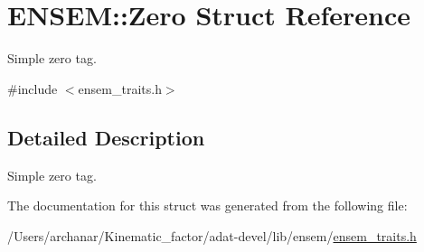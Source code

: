 \hypertarget{structENSEM_1_1Zero}{}\section{E\+N\+S\+EM\+:\+:Zero Struct Reference}
\label{structENSEM_1_1Zero}


Simple zero tag.  




{\ttfamily \#include $<$ensem\+\_\+traits.\+h$>$}



\subsection{Detailed Description}
Simple zero tag. 

The documentation for this struct was generated from the following file\+:\begin{DoxyCompactItemize}
\item 
/\+Users/archanar/\+Kinematic\+\_\+factor/adat-\/devel/lib/ensem/\mbox{\hyperlink{adat-devel_2lib_2ensem_2ensem__traits_8h}{ensem\+\_\+traits.\+h}}\end{DoxyCompactItemize}
